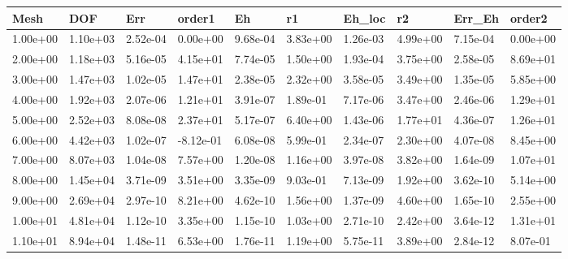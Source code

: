 \begin{tabular}{llllllllll}
Mesh & DOF & Err & order1 & Eh & r1 & Eh_loc & r2 & Err_Eh & order2 \\ 
\hline 
1.00e+00 & 1.10e+03 & 2.52e-04 &  0.00e+00 & 9.68e-04 & 3.83e+00 & 1.26e-03 & 4.99e+00 & 7.15e-04 & 0.00e+00 \\ 
2.00e+00 & 1.18e+03 & 5.16e-05 &  4.15e+01 & 7.74e-05 & 1.50e+00 & 1.93e-04 & 3.75e+00 & 2.58e-05 & 8.69e+01 \\ 
3.00e+00 & 1.47e+03 & 1.02e-05 &  1.47e+01 & 2.38e-05 & 2.32e+00 & 3.58e-05 & 3.49e+00 & 1.35e-05 & 5.85e+00 \\ 
4.00e+00 & 1.92e+03 & 2.07e-06 &  1.21e+01 & 3.91e-07 & 1.89e-01 & 7.17e-06 & 3.47e+00 & 2.46e-06 & 1.29e+01 \\ 
5.00e+00 & 2.52e+03 & 8.08e-08 &  2.37e+01 & 5.17e-07 & 6.40e+00 & 1.43e-06 & 1.77e+01 & 4.36e-07 & 1.26e+01 \\ 
6.00e+00 & 4.42e+03 & 1.02e-07 & -8.12e-01 & 6.08e-08 & 5.99e-01 & 2.34e-07 & 2.30e+00 & 4.07e-08 & 8.45e+00 \\ 
7.00e+00 & 8.07e+03 & 1.04e-08 &  7.57e+00 & 1.20e-08 & 1.16e+00 & 3.97e-08 & 3.82e+00 & 1.64e-09 & 1.07e+01 \\ 
8.00e+00 & 1.45e+04 & 3.71e-09 &  3.51e+00 & 3.35e-09 & 9.03e-01 & 7.13e-09 & 1.92e+00 & 3.62e-10 & 5.14e+00 \\ 
9.00e+00 & 2.69e+04 & 2.97e-10 &  8.21e+00 & 4.62e-10 & 1.56e+00 & 1.37e-09 & 4.60e+00 & 1.65e-10 & 2.55e+00 \\ 
1.00e+01 & 4.81e+04 & 1.12e-10 &  3.35e+00 & 1.15e-10 & 1.03e+00 & 2.71e-10 & 2.42e+00 & 3.64e-12 & 1.31e+01 \\ 
1.10e+01 & 8.94e+04 & 1.48e-11 &  6.53e+00 & 1.76e-11 & 1.19e+00 & 5.75e-11 & 3.89e+00 & 2.84e-12 & 8.07e-01 \\ 
\hline 
\end{tabular}